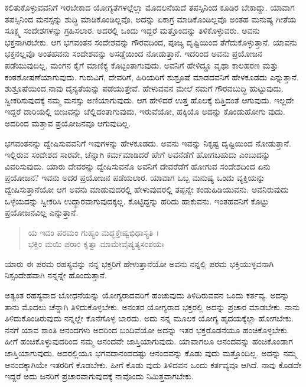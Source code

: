 ಕಲಿತುಕೊಳ್ಳುವವನಿಗೆ ಇರಬೇಕಾದ ಯೋಗ್ಯತೆಗಳಲ್ಲೆಲ್ಲಾ ಮೊದಲನೆಯದೆ ತಪಸ್ಸಿನಿಂದ ಕೂಡಿರ ಬೇಕಾದ್ದು. ಯಾವಾಗ ತಪಸ್ಸಿನಿಂದ ಮನಸ್ಸನ್ನು ಶುದ್ಧಿ ಮಾಡಿಕೊಂಡಿಲ್ಲವೊ, ಅದನ್ನು ಏಕಾಗ್ರ ಮಾಡಿಕೊಂಡಿಲ್ಲವೊ ಅಂತಹ ಮನುಷ್ಯ ಗೀತೆಯ ಸೂಕ್ಷ್ಮ ಸಂದೇಶಗಳನ್ನು ಗ್ರಹಿಸಲಾರ. ಅದರಲ್ಲಿ ಒಂದು ಇದ್ದರೆ ಮತ್ತೊಂದನ್ನು ತಿಳಿಕೊಳ್ಳುವರು. ಅವನು ಭಕ್ತನಾಗಿರಬೇಕು. ಆಗ ಭಗವಂತನ ಸಂದೇಶವನ್ನು ಗೌರವದಿಂದ, ಪೂಜ್ಯ ದೃಷ್ಟಿಯಿಂದ ತೆಗೆದುಕೊಳ್ಳುತ್ತಾನೆ. ಯಾವನು ಭಕ್ತನಲ್ಲವೊ ಅಂತಹವನು ಸಂದೇಶವನ್ನು ಅಸಡ್ಡೆಯಿಂದ ನೋಡುತ್ತಾನೆ. ಇದರಿಂದ ಅವನು ಪ್ರಯೋಜನ ಪಡೆಯುವುದಿಲ್ಲ. ಮಂಗನ ಕೈಗೆ ಮಾಣಿಕ್ಯ ಕೊಟ್ಟಂತಾಗುವುದು. ಅವನಿಗೆ ಹೇಳಿದ್ದೂ ವೃಥಾ ಕಾಲಹರಣ ಮತ್ತು ಕಂಠಶೋಷಣೆಯಾಗುವುದು. ಗುರುವಿಗೆ, ದೇವರಿಗೆ, ಹಿರಿಯರಿಗೆ ಶುಶ್ರೂಷೆ ಮಾಡದವನಿಗೆ ಹೇಳಕೂಡದು ಎನ್ನುತ್ತಾನೆ. ಶುಶ್ರೂಷೆಯಿಂದ ನಾವು ದೈನ್ಯತೆಯನ್ನು ಪಡೆಯುತ್ತೇವೆ. ಹೇಳುವವನ ಮೇಲೆ ನಮಗೆ ಗೌರವಬುದ್ಧಿ ಹುಟ್ಟುವುದು. ಸ್ವೀಕರಿಸುವುದಕ್ಕೆ ನಮ್ಮ ಮನಸ್ಸು ಅಣಿಯಾಗುವುದು. ಆಗ ಹೇಳಿದರೆ ಉತ್ತ ಹೊಲಕ್ಕೆ ಬಿತ್ತಿದಂತೆ ಆಗುವುದು. ಇಲ್ಲದೇ ಇದ್ದರೆ ದಾರಿಯಲ್ಲಿ ಬೀಜವನ್ನು ಚೆಲ್ಲಿದಂತಾಗುವುದು. ಇರುವೆಯೋ, ಹಕ್ಕಿಯೊ ಅದನ್ನು ಕೊಂಡುಹೋಗು ವುದು. ಅದರಿಂದ ಮತ್ತಾವ ಪ್ರಯೋಜನವೂ ಆಗುವುದಿಲ್ಲ.

ಭಗವಂತನನ್ನು ದ್ವೇಷಿಸುವವನಿಗೆ ಇವುಗಳನ್ನು ಹೇಳಕೂಡದು. ಅವನು ಇವನ್ನು ನಿಕೃಷ್ಟ ದೃಷ್ಟಿಯಿಂದ ನೋಡುತ್ತಾನೆ. ಇಲ್ಲಿರುವ ಸಂದೇಶದ ಸಾರವೇ, ಚೆನ್ನಾಗಿ ಕರ್ಮಮಾಡಿದರೆ ಹೇಗೆ ಅವನೆಡೆಗೆ ಹೋಗಬಹುದು ಎಂಬುದನ್ನು ವಿವರಿಸುವುದು. ಯಾರು ದೇವರನ್ನು ದ್ವೇಷಿಸುವನೊ ಅವನಿಗೆ ದೇವರೆಡೆಗೆ ಹೋಗುವ ಸಂದೇಶದಿಂದ ಏನು ಪ್ರಯೋಜನ? ಇವನು ಅದರ ಪ್ರಯೋಜನ ಪಡೆಯಲಾರ. ಯಾವಾಗ ಒಬ್ಬ ಮನುಷ್ಯ ಒಂದು ವ್ಯಕ್ತಿಯನ್ನು ದ್ವೇಷಿಸುತ್ತಾನೆಯೋ ಆಗ ಅವನು ಮಾಡುವುದರಲ್ಲಿ ಹೇಳುವುದರಲ್ಲಿ ತಪ್ಪನ್ನೇ ಕಂಡುಹಿಡಿಯುವನು. ಅವನಿರುವುದು ಒಳ್ಳೆಯದನ್ನು ಸ್ವೀಕರಿಸಿ ಉದ್ಧಾರವಾಗುವುದಕ್ಕಲ್ಲ. ಕೊಟ್ಟಿದ್ದನ್ನು ಹರಿದು ಹಾಕುವನು. ಇಂತಹವನಿಗೆ ಕೊಟ್ಟು ಪ್ರಯೋಜನವಿಲ್ಲ ಎನ್ನುತ್ತಾನೆ.

\begin{verse}
ಯ ಇದಂ ಪರಮಂ ಗುಹ್ಯಂ ಮದ್ಭಕ್ತೇಷ್ವಭಿಧಾಸ್ಯತಿ ।\\ಭಕ್ತಿಂ ಮಯಿ ಪರಾಂ ಕೃತ್ವಾ ಮಾಮೇವೈಷ್ಯತ್ಯಸಂಶಯಃ 
\end{verse}

{\small ಯಾರು ಈ ಪರಮ ರಹಸ್ಯವನ್ನು ನನ್ನ ಭಕ್ತರಿಗೆ ಹೇಳುತ್ತಾನೆಯೋ ಅವನು ನನ್ನಲ್ಲಿ ಪರಮ ಭಕ್ತಿಯುಳ್ಳವನಾಗಿ ನಿಸ್ಸಂದೇಹವಾಗಿ ನನ್ನನ್ನೇ ಹೊಂದುತ್ತಾನೆ.}

ಅತ್ಯಂತ ರಹಸ್ಯವಾದ ಬೋಧನೆಯನ್ನು ಯೋಗ್ಯರಾದವರಿಗೆ ಹಂಚುವುದು ತಿಳಿದಿರುವವನ ಒಂದು ಕರ್ತವ್ಯ. ಅದನ್ನು ತಾನು ಮೊದಲು ಚೆನ್ನಾಗಿ ತಿಳಿದುಕೊಳ್ಳಬೇಕು. ಅನಂತರ ಯೋಗ್ಯರಾದ ಭಕ್ತರಲ್ಲಿ ಅದನ್ನು ಪ್ರಚಾರ ಮಾಡಬೇಕು. ನಾನು ತಿಳಿದುಕೊಂಡಿರುವುದು ನನ್ನಲ್ಲೇ ಕೊನೆಗೊಳ್ಳ ಬಾರದು. ಅದು ನನ್ನ ಮೂಲಕ ಯೋಗ್ಯ ಹೃದಯಕ್ಕೆಲ್ಲಾ ಹೋಗಬೇಕು. ನನಗೆ ಯಾವ ಶಾಂತಿ ಆನಂದಗಳು ಅದರಿಂದ ಬಂದಿವೆಯೋ ಅದನ್ನು ಇತರ ಭಕ್ತರೊಡನೆಯೂ ಹಂಚಿಕೊಳ್ಳಬೇಕು. ಹೀಗೆ ಹಂಚಿಕೊಳ್ಳುವುದರಿಂದ ನಮ್ಮ ಆನಂದವೇ ಜಾಸ್ತಿಯಾಗುವುದು. ಯಾವಾಗಲೂ ಆನಂದವನ್ನು ಹಂಚಿಕೊಂಡಾಗ ಜಾಸ್ತಿಯಾಗುವುದು. ಅದರಲ್ಲಿಯೂ ಭಗವದಾನಂದದಷ್ಟು ಆನಂದವನ್ನು ಕೊಡು ವುದು ಮತ್ತೊಂದಿಲ್ಲ. ಅದನ್ನು ನಮ್ಮ ಆನಂದಕ್ಕಾಗಿಯೇ ಇತರರಿಗೆ ಕೊಡಬೇಕು. ಹೀಗೆ ಕೊಡು ವುದು ತಿಳಿದವನ ಒಂದು ಕರ್ತವ್ಯವೂ ಆಗಿದೆ. ನಾವು ಕೊಡದೇ ಇದ್ದರೆ ಅದು ಜನರಿಗೆ ಪ್ರಚಾರವಾಗುವುದಕ್ಕೆ ನಾವೊಂದು ನಿಮಿತ್ತವಾಗಬೇಕು.

